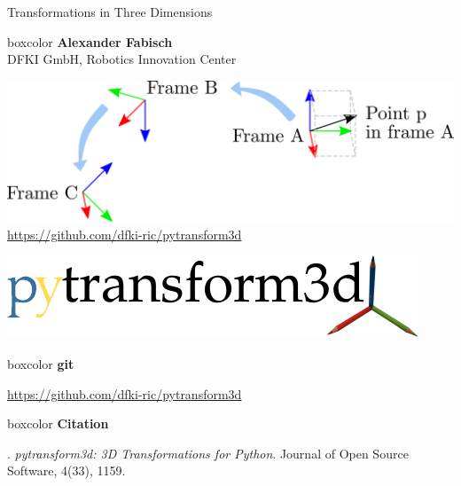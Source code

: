\documentclass[14pt]{beamer}
\begin{document}
\begin{frame}
\begin{center}
{Transformations in Three Dimensions\par}
\vfill

\begin{beamercolorbox}[sep=0.5em,center]{boxcolor}
\textbf{Alexander Fabisch}\\
DFKI GmbH, Robotics Innovation Center
\end{beamercolorbox}

\vfill
\includegraphics[width=\textwidth]{images/transformation_modeling}
\vfill
\url{https://github.com/dfki-ric/pytransform3d}
\end{center}
\end{frame}

\begin{frame}
\includegraphics[width=\textwidth]{images/logo}
\begin{beamercolorbox}[wd=\textwidth,sep=1em]{boxcolor}
\textbf{git}

{\small \url{https://github.com/dfki-ric/pytransform3d}}
\end{beamercolorbox}

\begin{beamercolorbox}[wd=\textwidth,sep=1em]{boxcolor}
\textbf{Citation}

\textcite{Fabisch2019}. \textit{pytransform3d: 3D Transformations for Python}. Journal of Open Source Software, 4(33), 1159.
\end{beamercolorbox}
\end{frame}
\end{document}

